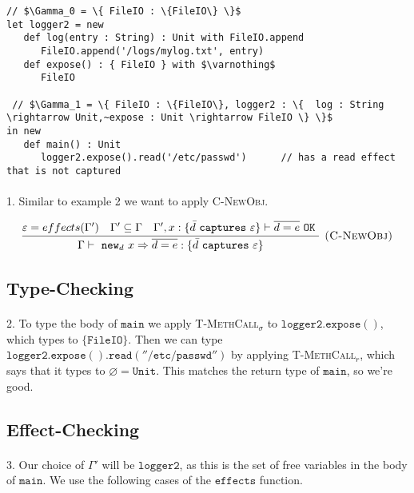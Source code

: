 \documentclass{llncs}
\newcommand{\keywadj}[1]{\mathtt{#1}}
\newcommand{\keyw}[1]{\keywadj{#1}~}
\begin{document}
\vspace{-6pt}
\begin{lstlisting}[xleftmargin=20pt]
// $\Gamma_0 = \{ FileIO : \{FileIO\} \}$
let logger2 = new
   def log(entry : String) : Unit with FileIO.append
      FileIO.append('/logs/mylog.txt', entry)
   def expose() : { FileIO } with $\varnothing$
      FileIO
      
 // $\Gamma_1 = \{ FileIO : \{FileIO\}, logger2 : \{  log : String \rightarrow Unit,~expose : Unit \rightarrow FileIO \} \}$
in new
   def main() : Unit
      logger2.expose().read('/etc/passwd')		// has a read effect that is not captured
\end{lstlisting}

\paragraph{}
1. Similar to example 2 we want to apply \textsc{C-NewObj}.


\[
\begin{array}{c}
\infer[\textsc{(C-NewObj)}]
	{\Gamma \vdash~\keywadj{new}_d~x \Rightarrow \overline{d = e} : \{  \bar d~\keyw{captures} \varepsilon \} }
	{\varepsilon = effects(\Gamma') & \Gamma' \subseteq \Gamma & \Gamma', x : \{ \bar d~\keyw {captures} \varepsilon \} \vdash \overline{d = e}~\keyw{OK}} \\
\end{array}
\]

\subsection*{Type-Checking}

\paragraph{}
2. To type the body of $\keywadj{main}$ we apply \textsc{T-MethCall$_\sigma$} to $\keywadj{logger2.expose()}$, which types to $\keywadj{\{FileIO\}}$. Then we can type  $\keywadj{logger2.expose().read(''/etc/passwd'')}$ by applying \textsc{T-MethCall$_r$}, which says that it types to $\keywadj{\varnothing = Unit}$. This matches the return type of $\keywadj{main}$, so we're good.

\subsection*{Effect-Checking}

\paragraph{}
3. Our choice of $\keywadj{\Gamma'}$ will be $\keywadj{logger2}$, as this is the set of free variables in the body of $\keywadj{main}$. We use the following cases of the $\keywadj{effects}$ function.
\end{document}
